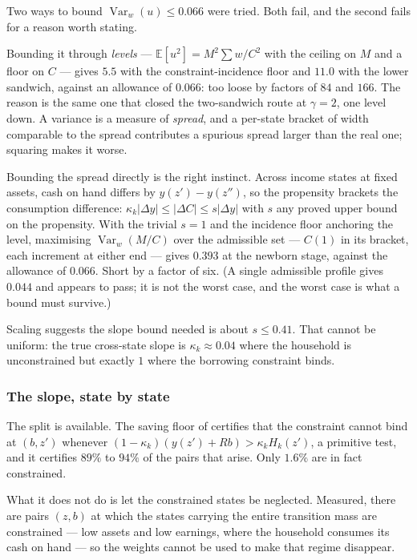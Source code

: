 Two ways to bound $\operatorname{Var}_w(u)\le0.066$ were tried. Both fail, and the second fails for a
reason worth stating.

Bounding it through \emph{levels} --- $\mathbb E[u^2]=M^2\sum w/C^2$ with the ceiling on $M$ and a
floor on $C$ --- gives $5.5$ with the constraint-incidence floor and $11.0$ with the lower sandwich,
against an allowance of $0.066$: too loose by factors of $84$ and $166$. The reason is the same one
that closed the two-sandwich route at $\gamma=2$, one level down. A variance is a measure of
\emph{spread}, and a per-state bracket of width comparable to the spread contributes a spurious
spread larger than the real one; squaring makes it worse.

Bounding the spread directly is the right instinct. Across income states at fixed assets, cash on
hand differs by $y(z')-y(z'')$, so the propensity brackets the consumption difference:
$\kappa_k|\Delta y|\le|\Delta C|\le s|\Delta y|$ with $s$ any proved upper bound on the propensity.
With the trivial $s=1$ and the incidence floor anchoring the level, maximising
$\operatorname{Var}_w(M/C)$ over the admissible set --- $C(1)$ in its bracket, each increment at
either end --- gives $0.393$ at the newborn stage, against the allowance of $0.066$. Short by a
factor of six. (A single admissible profile gives $0.044$ and appears to pass; it is not the worst
case, and the worst case is what a bound must survive.)

Scaling suggests the slope bound needed is about $s\le0.41$. That cannot be uniform: the true
cross-state slope is $\kappa_k\approx0.04$ where the household is unconstrained but exactly $1$ where
the borrowing constraint binds.

\subsubsection*{The slope, state by state}

The split is available. The saving floor of  certifies that the
constraint cannot bind at $(b,z')$ whenever $(1-\kappa_k)(y(z')+Rb)>\kappa_kH_k(z')$, a primitive
test, and it certifies $89\%$ to $94\%$ of the pairs that arise. Only $1.6\%$ are in fact
constrained.

What it does not do is let the constrained states be neglected. Measured, there are pairs $(z,b)$ at
which the states carrying the entire transition mass are constrained --- low assets and low earnings,
where the household consumes its cash on hand --- so the weights cannot be used to make that regime
disappear.

